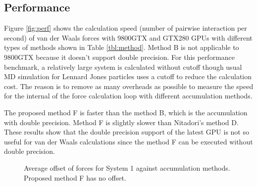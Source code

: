 \subsection{Performance}

Figure \ref{fig:perf} shows the calculation speed (number of pairwise
interaction per second) of van der Waals forces with 9800GTX and 
GTX280 GPUs with different types of methods shown in Table
\ref{tbl:method}. Method B is not applicable to 9800GTX because it
doesn't support double precision.  For this performance benchmark, a
relatively large system is calculated without cutoff though usual MD
simulation for Lennard Jones particles uses a cutoff to reduce the
calculation cost.  The reason is to remove as many overheads as
possible to measure the speed for the internal of the force
calculation loop with different accumulation methods.

The proposed method F is faster than the method B, which is the 
accumulation with
double precision. Method F is slightly slower than Nitadori's
method D. These results show that the double precision support of the
latest GPU is not so useful for van der Waals calculations since the
method F can be executed without double precision.


\begin{figure}
\begin{center}
\vspace*{-3mm}
\caption{Average offset of forces for System 1 against accumulation methods.
Proposed method F has no offset.}
\label{fig:aof}
\end{center}
\end{figure}

